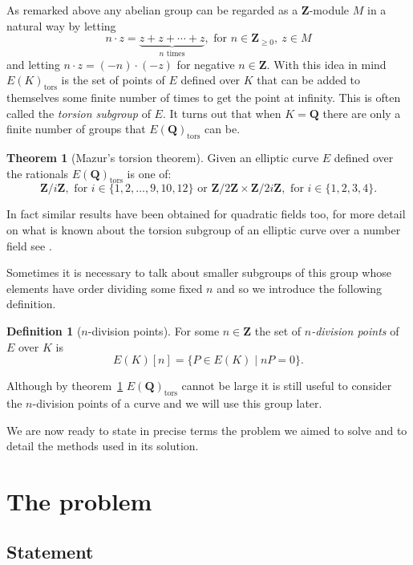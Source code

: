 \documentclass[a4paper,abstracton,bibtotoc]{scrreprt}
\theoremstyle{definition}
\newtheorem{thm}{Theorem}
\newtheorem{defn}{Definition}
\newcommand{\QQ}{\mathbf{Q}}
\newcommand{\ZZ}{\mathbf{Z}}
\begin{document}
As remarked above any abelian group can be regarded as a $\ZZ$-module $M$ in a natural way by letting 
\[n\cdot z = \underbrace{z + z + \cdots + z}_\text{$n$ times},\text{ for } n\in\ZZ_{\ge 0},\ z\in M\]
and letting $n\cdot z = (-n)\cdot(-z)$ for negative $n\in \ZZ$.
With this idea in mind $E(K)_\text{tors}$ is the set of points of $E$ defined over $K$ that can be added to themselves some finite number of times to get the point at infinity.
This is often called the \emph{torsion subgroup} of $E$.
It turns out that when $K = \QQ$ there are only a finite number of groups that $E(\QQ)_\text{tors}$ can be.

\begin{thm}[Mazur's torsion theorem]
\label{thm:tors}
Given an elliptic curve $E$ defined over the rationals $E(\QQ)_\text{tors}$ is one of:
\[
\ZZ/i\ZZ,\text{ for } i \in\{1,2,\ldots,9,10,12\}\text{ or }
\ZZ/2\ZZ \times \ZZ/2i\ZZ,\text{ for } i \in\{1,2,3,4\}.
\]
\end{thm}

In fact similar results have been obtained for quadratic fields too, for more detail on what is known about the torsion subgroup of an elliptic curve over a number field see \cite{sutherland}.

Sometimes it is necessary to talk about smaller subgroups of this group whose elements have order dividing some fixed $n$ and so we introduce the following definition.
\begin{defn}[$n$-division points]
For some $n\in\ZZ$ the set of \emph{$n$-division points} of $E$ over $K$ is
\[
E(K)[n] = \{P\in E(K) \mid nP = 0\}.
\]
\end{defn}
Although by theorem~\ref{thm:tors} $E(\QQ)_\text{tors}$ cannot be large it is still useful to consider the $n$-division points of a curve and we will use this group later.

\minisec{}
We are now ready to state in precise terms the problem we aimed to solve and to detail the methods used in its solution.

\chapter{The problem}
\label{chap:prob}
\section{Statement}
\label{sec:statements}
\end{document}
